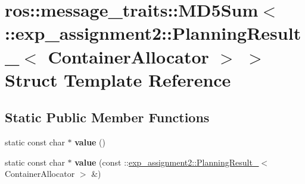 \hypertarget{structros_1_1message__traits_1_1MD5Sum_3_01_1_1exp__assignment2_1_1PlanningResult___3_01ContainerAllocator_01_4_01_4}{}\section{ros\+:\+:message\+\_\+traits\+:\+:M\+D5\+Sum$<$ \+:\+:exp\+\_\+assignment2\+:\+:Planning\+Result\+\_\+$<$ Container\+Allocator $>$ $>$ Struct Template Reference}
\label{structros_1_1message__traits_1_1MD5Sum_3_01_1_1exp__assignment2_1_1PlanningResult___3_01ContainerAllocator_01_4_01_4}
\subsection*{Static Public Member Functions}
\begin{DoxyCompactItemize}
\item 
\mbox{\label{structros_1_1message__traits_1_1MD5Sum_3_01_1_1exp__assignment2_1_1PlanningResult___3_01ContainerAllocator_01_4_01_4_a4d5db517505c38c4a2ed23f6464b2d14}} 
static const char $\ast$ {\bfseries value} ()
\item 
\mbox{\label{structros_1_1message__traits_1_1MD5Sum_3_01_1_1exp__assignment2_1_1PlanningResult___3_01ContainerAllocator_01_4_01_4_ac80000a477740ce6270980b73dd027b3}} 
static const char $\ast$ {\bfseries value} (const \+::\hyperlink{structexp__assignment2_1_1PlanningResult__}{exp\+\_\+assignment2\+::\+Planning\+Result\+\_\+}$<$ Container\+Allocator $>$ \&)
\end{DoxyCompactItemize}

